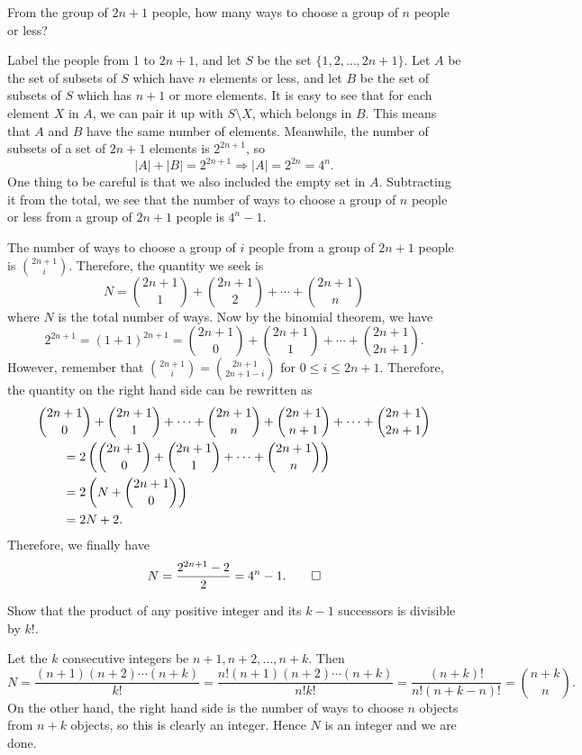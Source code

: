 \begin{question}
    From the group of $2n + 1$ people, how many ways to choose a group of $n$
    people or less?
\end{question}
\begin{solution}[1]
    Label the people from 1 to $2n + 1$, and let $S$ be the set $\{ 1, 2,
    \ldots, 2n + 1 \}$. Let $A$ be the set of subsets of $S$ which have $n$
    elements or less, and let $B$ be the set of subsets of $S$ which has $n +
    1$ or more elements. It is easy to see that for each element $X$ in $A$, we
    can pair it up with $S \setminus X$, which belongs in $B$. This means that
    $A$ and $B$ have the same number of elements. Meanwhile, the number of
    subsets of a set of $2n + 1$ elements is $2^{2n + 1}$, so 
    \[ |A| + |B| = 2^{2n + 1} \Longrightarrow |A| = 2^{2n} = 4^n. \]
    One thing to be careful is that we also included the empty set in $A$.
    Subtracting it from the total, we see that the number of ways to choose a
    group of $n$ people or less from a group of $2n + 1$ people is $4^n - 1$.
\end{solution}
\begin{solution}[2]
    The number of ways to choose a group of $i$ people from a group of $2n + 1$
    people is $\binom{2n + 1}{i}$. Therefore, the quantity we seek is
    \[N = \binom{2n + 1}{1} + \binom{2n + 1}{2} + \cdots + \binom{2n + 1}{n} \]
    where $N$ is the total number of ways. Now by the binomial theorem, we have
    \[ 2^{2n + 1} = (1 + 1)^{2n + 1} = \binom{2n + 1}{0} + \binom{2n + 1}{1} +
    \cdots + \binom{2n + 1}{2n + 1}. \]
    However, remember that $\binom{2n + 1}{i} = \binom{2n + 1}{2n + 1 - i}$ for
    $0 \leq i \leq 2n + 1$. Therefore, the quantity on the right hand side can
    be rewritten as
    \begin{align*}
        \MoveEqLeft
    \binom{2n + 1}{0} + \binom{2n + 1}{1} + \cdots + \binom{2n + 1}{n} + \binom{2n + 1}{n + 1} + \cdots + \binom{2n + 1}{2n + 1}\\ 
        &= 2\left( \binom{2n + 1}{0} + \binom{2n + 1}{1} + \cdots + \binom{2n + 1}{n} \right)\\
        &= 2\left( N + \binom{2n + 1}{0} \right)\\
        &= 2N + 2.
    \end{align*}
    Therefore, we finally have
    \[ N = \frac{2^{2n + 1} - 2}{2} = 4^n - 1. \qedhere \]
\end{solution}

\begin{question}
    Show that the product of any positive integer and its $k - 1$ successors is
    divisible by $k!$. 
\end{question}
\begin{solution}
    Let the $k$ consecutive integers be $n + 1, n + 2, \ldots, n + k$. Then 
    \[ N = \frac{(n + 1)(n + 2) \cdots (n + k)}{k!} = \frac{n!(n + 1)(n + 2)
    \cdots (n + k)}{n!k!} = \frac{(n + k)!}{n!(n + k - n)!} = \binom{n + k}{n}.
    \]
    On the other hand, the right hand side is the number of ways to choose $n$
    objects from $n + k$ objects, so this is clearly an integer. Hence $N$ is
    an integer and we are done.
\end{solution}

